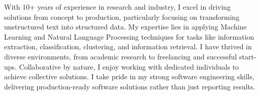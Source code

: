 

\begin{cvparagraph}

With 10+ years of experience in research and industry, I excel in driving solutions from concept to production, particularly focusing on transforming unstructured text into structured data. My expertise lies in applying Machine Learning and Natural Language Processing techniques for tasks like information extraction, classification, clustering, and information retrieval. I have thrived in diverse environments, from academic research to freelancing and successful start-ups. Collaborative by nature, I enjoy working with dedicated individuals to achieve collective solutions. I take pride in my strong software engineering skills, delivering production-ready software solutions rather than just reporting results.
\end{cvparagraph}
